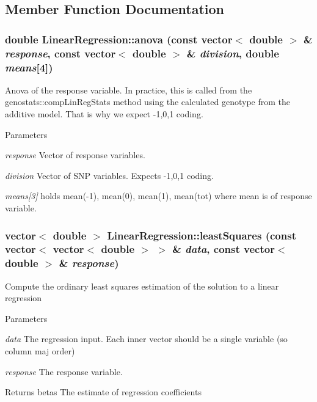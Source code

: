 \subsection{Member Function Documentation}
\hypertarget{classLinearRegression_affb7f28584f32975adf12f3a624cfe15}{
\subsubsection[{anova}]{\setlength{\rightskip}{0pt plus 5cm}double LinearRegression::anova (const vector$<$ double $>$ \& {\em response}, \/  const vector$<$ double $>$ \& {\em division}, \/  double {\em means}\mbox{[}4\mbox{]})}}
\label{classLinearRegression_affb7f28584f32975adf12f3a624cfe15}
Anova of the response variable. In practice, this is called from the genostats::compLinRegStats method using the calculated genotype from the additive model. That is why we expect -\/1,0,1 coding.


\begin{DoxyParams}{Parameters}
\item[{\em response}]Vector of response variables. \item[{\em division}]Vector of SNP variables. Expects -\/1,0,1 coding. \item[{\em means\mbox{[}3\mbox{]}}]holds mean(-\/1), mean(0), mean(1), mean(tot) where mean is of response variable. \end{DoxyParams}
\hypertarget{classLinearRegression_a37f79d0d49e5fe93cf5a04b20d17d829}{
\subsubsection[{leastSquares}]{\setlength{\rightskip}{0pt plus 5cm}vector$<$ double $>$ LinearRegression::leastSquares (const vector$<$ vector$<$ double $>$ $>$ \& {\em data}, \/  const vector$<$ double $>$ \& {\em response})}}
\label{classLinearRegression_a37f79d0d49e5fe93cf5a04b20d17d829}
Compute the ordinary least squares estimation of the solution to a linear regression


\begin{DoxyParams}{Parameters}
\item[{\em data}]The regression input. Each inner vector should be a single variable (so column maj order) \item[{\em response}]The response variable. \end{DoxyParams}
\begin{DoxyReturn}{Returns}
betas The estimate of regression coefficients 
\end{DoxyReturn}


